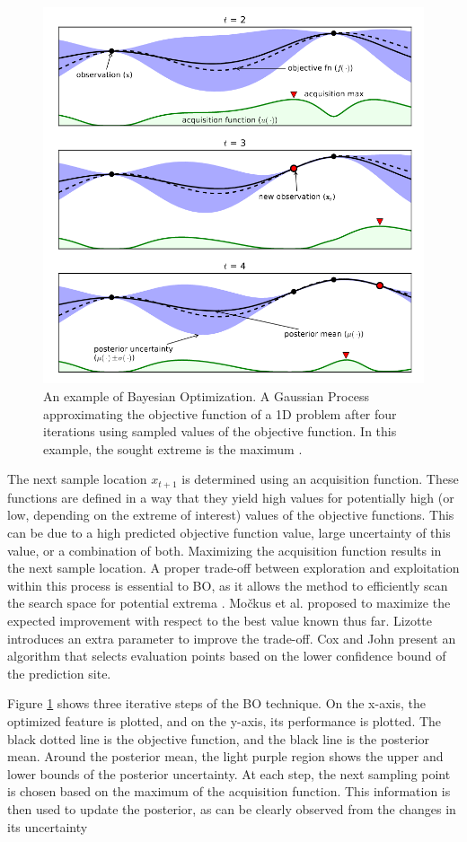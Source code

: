 \begin{figure}[h]
    \centering
    \includegraphics[width=0.6\linewidth]{Literature Survey - DCSC template/figuresLIT/BayesianOptmization.png}
    \caption{An example of Bayesian Optimization. A Gaussian Process approximating the objective function of a 1D problem after four iterations using sampled values of the objective function. In this example, the sought extreme is the maximum \cite{bo_tutorial}.}
    \label{fig::BO}
\end{figure}

The next sample location $x_{t+1}$ is determined using an acquisition function. These functions are defined in a way that they yield high values for potentially high (or low, depending on the extreme of interest) values of the objective functions. This can be due to a high predicted objective function value, large uncertainty of this value, or a combination of both. Maximizing the acquisition function results in the next sample location. A proper trade-off between exploration and exploitation within this process is essential to BO, as it allows the method to efficiently scan the search space for potential extrema \cite{bo_tutorial}. 
Močkus et al. \cite{Mockus1978} proposed to maximize the expected improvement with respect to the best value known thus far. Lizotte \cite{Lizotte2008} introduces an extra parameter to improve the trade-off. Cox and John \cite{CoxJohn1997} present an algorithm that selects evaluation points based on the lower confidence bound of the prediction site. 

Figure \ref{fig::BO} shows three iterative steps of the BO technique. On the x-axis, the optimized feature is plotted, and on the y-axis, its performance is plotted. The black dotted line is the objective function, and the black line is the posterior mean. Around the posterior mean, the light purple region shows the upper and lower bounds of the posterior uncertainty. At each step, the next sampling point is chosen based on the maximum of the acquisition function. This information is then used to update the posterior, as can be clearly observed from the changes in its uncertainty


